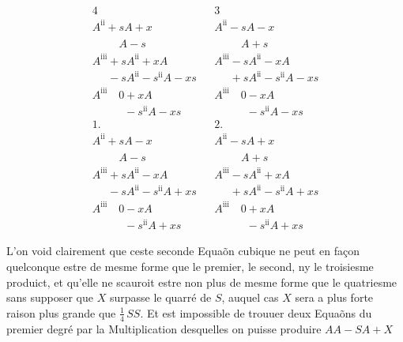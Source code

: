 \documentclass[11pt,a4paper]{article}
\begin{document}
\[ \begin{array}{lcl}
\text{4} & & \text{3} \\
A^{\mathrm{ii}} + sA + x & & A^{\mathrm{ii}} - sA - x \\
\phantom{A^{\mathrm{ii}} + {}} A - s & & \phantom{A^{\mathrm{ii}} - {}} A + s \\ \hline
A^{\mathrm{iii}} + sA^{\mathrm{ii}} + xA & & A^{\mathrm{iii}} - sA^{\mathrm{ii}} - xA \\
\phantom{A^{\mathrm{iii}}} - sA^{\mathrm{ii}} - s^{\mathrm{ii}}A - xs & & \phantom{A^{\mathrm{iii}}} + sA^{\mathrm{ii}} - s^{\mathrm{ii}}A - xs \\ \hline
A^{\mathrm{iii}} \quad 0 + xA & & A^{\mathrm{iii}} \quad 0 - xA \\
\phantom{A^{\mathrm{iii}} \quad 0} - s^{\mathrm{ii}}A - xs & & \phantom{A^{\mathrm{iii}} \quad 0} - s^{\mathrm{ii}}A - xs \\[1ex]
\text{1.} & & \text{2.} \\
A^{\mathrm{ii}} + sA - x & & A^{\mathrm{ii}} - sA + x \\
\phantom{A^{\mathrm{ii}} + {}} A - s & & \phantom{A^{\mathrm{ii}} - {}} A + s \\ \hline
A^{\mathrm{iii}} + sA^{\mathrm{ii}} - xA & & A^{\mathrm{iii}} - sA^{\mathrm{ii}} + xA \\
\phantom{A^{\mathrm{iii}}} - sA^{\mathrm{ii}} - s^{\mathrm{ii}}A + xs & & \phantom{A^{\mathrm{iii}}} + sA^{\mathrm{ii}} - s^{\mathrm{ii}}A + xs \\ \hline
A^{\mathrm{iii}} \quad 0 - xA & & A^{\mathrm{iii}} \quad 0 + xA \\
\phantom{A^{\mathrm{iii}} \quad 0} - s^{\mathrm{ii}}A + xs & & \phantom{A^{\mathrm{iii}} \quad 0} - s^{\mathrm{ii}}A + xs
\end{array} \]

L'on void clairement que ceste seconde Equaõn cubique ne peut en façon quelconque estre de mesme forme que le premier, le second, ny le troisiesme produict, et qu'elle ne scauroit estre non plus de mesme forme que le quatriesme sans supposer que $X$ surpasse le quarré de $S$, auquel cas $X$ sera a plus forte raison plus grande que $\frac{1}{4}\,SS$. Et est impossible de trouuer \struck{\ill{}} deux Equaõns du premier degré par la Multiplication desquelles on puisse produire $AA - SA + X$
\end{document}
